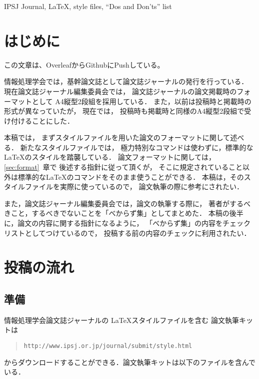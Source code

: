 \documentclass[submit]{ipsj}
\def\|{\verb|}
\begin{document}
\begin{ekeyword}
IPSJ Journal, \LaTeX, style files, ``Dos and Don'ts'' list
\end{ekeyword}

\maketitle

%1
\section{はじめに}

この文章は、OverleafからGithubにPushしている。

情報処理学会では，基幹論文誌として論文誌ジャーナルの発行を行っている．
現在論文誌ジャーナル編集委員会では，
論文誌ジャーナルの論文掲載時のフォーマットとして
A4縦型2段組を採用している．
また，以前は投稿時と掲載時の形式が異なっていたが，
現在では，
投稿時も掲載時と同様のA4縦型2段組で受け付けることにした．


本稿では，
まずスタイルファイルを用いた論文のフォーマットに関して述べる．
新たなスタイルファイルでは，
極力特別なコマンドは使わずに，標準的な \LaTeX のスタイルを踏襲している．
論文フォーマットに関しては，\ref{sec:format}~章で
後述する指針に従って頂くが，
そこに規定されていること以外は標準的な\LaTeX のコマンドをそのまま使うことができる．
本稿は，そのスタイルファイルを実際に使っているので，
論文執筆の際に参考にされたい．





また，論文誌ジャーナル編集委員会では，論文の執筆する際に，
著者がするべきこと，するべきでないことを「べからず集」としてまとめた．
本稿の後半に，論文の内容に関する指針になるように，
「べからず集」の内容をチェックリストとしてつけているので，
投稿する前の内容のチェックに利用されたい．




%2
\section{投稿の流れ}


%2.1
\subsection{準備}


情報処理学会論文誌ジャーナルの \LaTeX スタイルファイルを含む
論文執筆キットは
\begin{quote}
\small
\|http://www.ipsj.or.jp/journal/submit/style.html|
\end{quote}
からダウンロードすることができる．論文執筆キットは以下のファイルを含んでいる．
\end{document}
